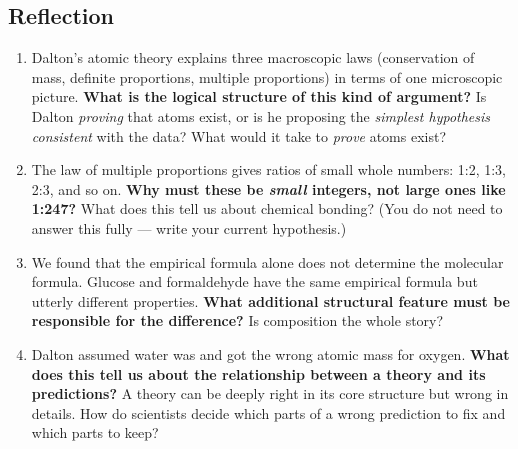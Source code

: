 \documentclass[12pt, a4paper]{book}
\theoremstyle{definition}
\begin{document}
\subsection*{Reflection}

\begin{reflectionbox}
\begin{enumerate}[label=\textbf{R\arabic*.}]
  \item Dalton's atomic theory explains three macroscopic laws
        (conservation of mass, definite proportions, multiple proportions)
        in terms of one microscopic picture.
        \textbf{What is the logical structure of this kind of argument?}
        Is Dalton \emph{proving} that atoms exist,
        or is he proposing the \emph{simplest hypothesis consistent}
        with the data?
        What would it take to \emph{prove} atoms exist?

  \item The law of multiple proportions gives ratios of small whole numbers:
        1:2, 1:3, 2:3, and so on.
        \textbf{Why must these be \emph{small} integers,
        not large ones like 1:247?}
        What does this tell us about chemical bonding?
        (You do not need to answer this fully ---
        write your current hypothesis.)

  \item We found that the empirical formula alone does not
        determine the molecular formula.
        Glucose and formaldehyde have the same empirical formula
        but utterly different properties.
        \textbf{What additional structural feature must be responsible
        for the difference?}
        Is composition the whole story?

  \item Dalton assumed water was  and got the wrong atomic
        mass for oxygen.
        \textbf{What does this tell us about the relationship
        between a theory and its predictions?}
        A theory can be deeply right in its core structure
        but wrong in details.
        How do scientists decide which parts of a wrong prediction
        to fix and which parts to keep?
\end{enumerate}
\end{reflectionbox}
\end{document}
